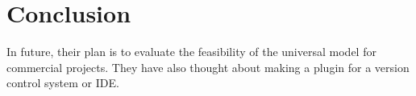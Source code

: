 \section{Conclusion}
In future, their plan is to evaluate the feasibility of the universal
model for commercial projects. They have also thought about making a plugin for a version control system or IDE.